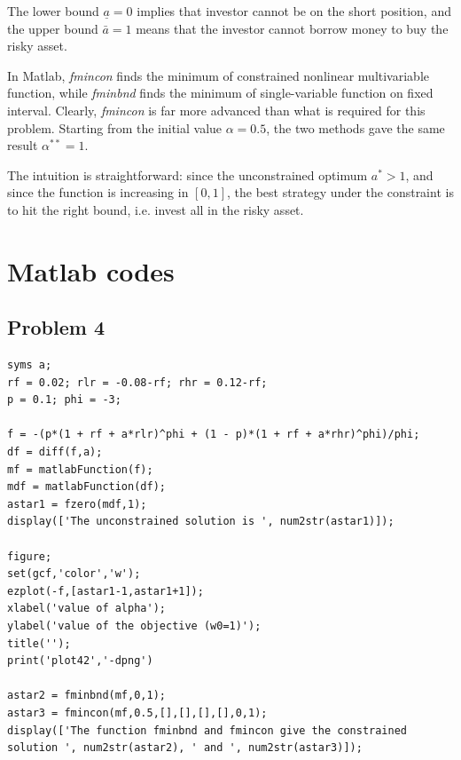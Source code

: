 \documentclass[11pt]{article}
\newcommand{\alp}{\ensuremath{\alpha}}
\begin{document}
The lower bound $\underline{a} = 0$ implies that investor cannot be on the short position, and the upper bound $\bar{a} = 1$ means that the investor cannot borrow money to buy the risky asset.

In Matlab, \emph{fmincon} finds the minimum of constrained nonlinear multivariable function, while \emph{fminbnd} finds the minimum of single-variable function on fixed interval. Clearly, \emph{fmincon} is far more advanced than what is required for this problem. Starting from the initial value $\alp = 0.5$, the two methods gave the same result $\alp^{**} = 1$.

The intuition is straightforward: since the unconstrained optimum $a^*>1$, and since the function is increasing in $[0,1]$, the best strategy under the constraint is to hit the right bound, i.e. invest all in the risky asset.

\appendix

\section*{Matlab codes}

\subsection*{Problem 4}

\begin{lstlisting}[style=Matlab-editor]
syms a;
rf = 0.02; rlr = -0.08-rf; rhr = 0.12-rf;
p = 0.1; phi = -3;

f = -(p*(1 + rf + a*rlr)^phi + (1 - p)*(1 + rf + a*rhr)^phi)/phi;
df = diff(f,a);
mf = matlabFunction(f);
mdf = matlabFunction(df);
astar1 = fzero(mdf,1);
display(['The unconstrained solution is ', num2str(astar1)]);

figure;
set(gcf,'color','w');
ezplot(-f,[astar1-1,astar1+1]);
xlabel('value of alpha');
ylabel('value of the objective (w0=1)');
title('');
print('plot42','-dpng')

astar2 = fminbnd(mf,0,1);
astar3 = fmincon(mf,0.5,[],[],[],[],0,1);
display(['The function fminbnd and fmincon give the constrained solution ', num2str(astar2), ' and ', num2str(astar3)]);
\end{lstlisting}
\end{document}
